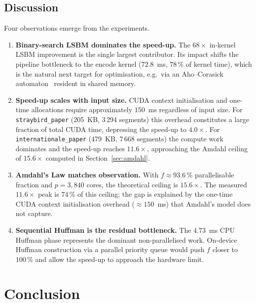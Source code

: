 \documentclass[runningheads]{llncs}
\begin{document}
\subsection{Discussion}
Four observations emerge from the experiments.
\begin{enumerate}
\item \textbf{Binary-search LSBM dominates the speed-up.}
   The $68\times$ in-kernel LSBM improvement is the single largest
   contributor.  Its impact shifts the pipeline bottleneck to the
   encode kernel ($72.8$~ms, $78\,\%$ of kernel time), which is the
   natural next target for optimisation, e.g.\ via an Aho--Corasick
   automaton~\cite{ref_acm1975} resident in shared memory.

\item \textbf{Speed-up scales with input size.}
   CUDA context initialisation and one-time allocations require
   approximately $150$~ms regardless of input size.  For
   \texttt{straybird\_paper} (205~KB, 3\,294 segments) this overhead
   constitutes a large fraction of total CUDA time, depressing the
   speed-up to $4.0\times$.  For \texttt{internationale\_paper}
   (479~KB, 7\,668 segments) the compute work dominates and the
   speed-up reaches $11.6\times$, approaching the Amdahl ceiling of
   $15.6\times$ computed in Section~\ref{sec:amdahl}.

\item \textbf{Amdahl's Law matches observation.}
   With $f \approx 93.6\,\%$ parallelisable fraction and $p =
   3{,}840$ cores, the theoretical ceiling is $15.6\times$.  The
   measured $11.6\times$ peak is $74\,\%$ of this ceiling; the gap
   is explained by the one-time CUDA context initialisation overhead
   (${\approx}150$~ms) that Amdahl's model does not capture.

\item \textbf{Sequential Huffman is the residual bottleneck.}
   The $4.73$~ms CPU Huffman phase represents the dominant
   non-parallelised work.  On-device Huffman construction via a
   parallel priority queue would push $f$ closer to $100\,\%$ and
   allow the speed-up to approach the hardware limit.
\end{enumerate}

\section{Conclusion}
\label{sec:conclusion}
\end{document}
